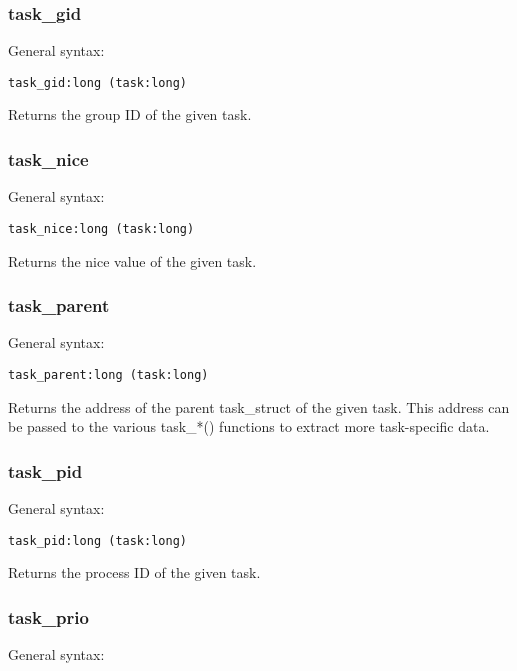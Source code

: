 \documentclass[twoside,english]{article}
\newenvironment{vindent}
{\begin{list}{}{\setlength{\listparindent}{6pt}}
\item[]}
{\end{list}}
\begin{document}
\subsubsection{task\_gid}
General syntax:

\begin{vindent}
\begin{verbatim}
task_gid:long (task:long)
\end{verbatim}
\end{vindent}
Returns the group ID of the given task.


\subsubsection{task\_nice}
General syntax:

\begin{vindent}
\begin{verbatim}
task_nice:long (task:long)
\end{verbatim}
\end{vindent}
Returns the nice value of the given task.


\subsubsection{task\_parent}
General syntax:

\begin{vindent}
\begin{verbatim}
task_parent:long (task:long)
\end{verbatim}
\end{vindent}
Returns the address of the parent task\_struct of the given
task. This address can be passed to the various task\_{*}() functions to
extract more task-specific data.


\subsubsection{task\_pid}
General syntax:

\begin{vindent}
\begin{verbatim}
task_pid:long (task:long)
\end{verbatim}
\end{vindent}
Returns the process ID of the given task.


\subsubsection{task\_prio}
General syntax:
\end{document}
